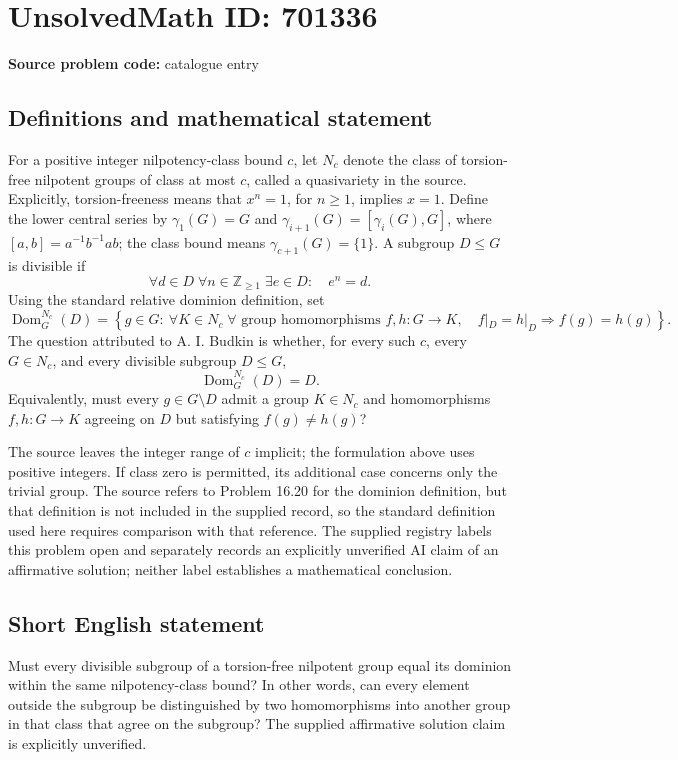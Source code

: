 \documentclass[11pt]{article}
\newcommand{\Z}{\mathbb{Z}}
\begin{document}
\section*{UnsolvedMath ID: 701336}
\textbf{Source problem code:} catalogue entry
\subsection{Definitions and mathematical statement}
For a positive integer nilpotency-class bound \(c\), let \(N_c\) denote the class of torsion-free nilpotent groups of class at most \(c\), called a quasivariety in the source. Explicitly, torsion-freeness means that \(x^n=1\), for \(n\geq 1\), implies \(x=1\). Define the lower central series by \(\gamma_1(G)=G\) and \(\gamma_{i+1}(G)=[\gamma_i(G),G]\), where \([a,b]=a^{-1}b^{-1}ab\); the class bound means \(\gamma_{c+1}(G)=\{1\}\). A subgroup \(D\leq G\) is divisible if
\[
\forall d\in D\;\forall n\in\Z_{\geq1}\;\exists e\in D:\quad e^n=d.
\]
Using the standard relative dominion definition, set
\[
\operatorname{Dom}^{N_c}_G(D)=
\left\{g\in G:\ \forall K\in N_c\;\forall\text{ group homomorphisms }f,h:G\to K,\quad f|_D=h|_D\Longrightarrow f(g)=h(g)\right\}.
\]
The question attributed to A. I. Budkin is whether, for every such \(c\), every \(G\in N_c\), and every divisible subgroup \(D\leq G\),
\[
\operatorname{Dom}^{N_c}_G(D)=D.
\]
Equivalently, must every \(g\in G\setminus D\) admit a group \(K\in N_c\) and homomorphisms \(f,h:G\to K\) agreeing on \(D\) but satisfying \(f(g)\neq h(g)\)?

The source leaves the integer range of \(c\) implicit; the formulation above uses positive integers. If class zero is permitted, its additional case concerns only the trivial group. The source refers to Problem 16.20 for the dominion definition, but that definition is not included in the supplied record, so the standard definition used here requires comparison with that reference. The supplied registry labels this problem open and separately records an explicitly unverified AI claim of an affirmative solution; neither label establishes a mathematical conclusion.
\subsection{Short English statement}
Must every divisible subgroup of a torsion-free nilpotent group equal its dominion within the same nilpotency-class bound? In other words, can every element outside the subgroup be distinguished by two homomorphisms into another group in that class that agree on the subgroup? The supplied affirmative solution claim is explicitly unverified.
\end{document}
